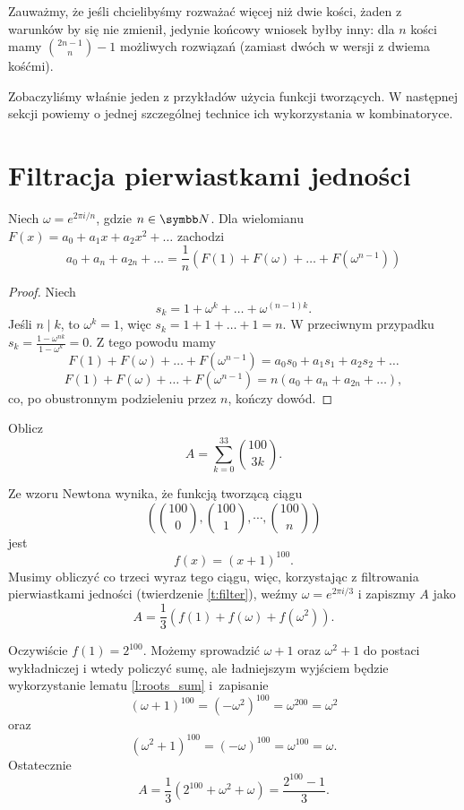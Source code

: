 \documentclass[bibliography=totocnumbered]{scrartcl}
\begin{document}
    Zauważmy, że jeśli chcielibyśmy rozważać więcej niż dwie kości, żaden z warunków by się nie zmienił, jedynie końcowy wniosek byłby inny: dla $n$ kości mamy $\binom{2n - 1}{n} - 1$ możliwych rozwiązań (zamiast dwóch w wersji z dwiema kośćmi).

    Zobaczyliśmy właśnie jeden z przykładów użycia funkcji tworzących. W następnej sekcji powiemy o jednej szczególnej technice ich wykorzystania w kombinatoryce.

\section{Filtracja pierwiastkami jedności}
    \begin{theorem}
        \label{t:filter}
        Niech $\omega = e^{2\pi i/n}$, gdzie $n \in \NN$. Dla wielomianu $F(x) = a_0 + a_1x + a_2x^2 + \ldots$ zachodzi
        $$ a_0 + a_n + a_{2n} + \ldots = \frac{1}{n}\left(F(1) + F(\omega) + \ldots + F(\omega^{n - 1})\right) $$
    \end{theorem}
    \begin{proof}
        Niech
        $$ s_k = 1 + \omega^k + \ldots + \omega^{(n - 1)k}. $$
        Jeśli $n \mid k$, to $\omega^k = 1$, więc $s_k = 1 + 1 + \ldots + 1 = n$. W przeciwnym przypadku $s_k = \frac{1 - \omega^{nk}}{1 - \omega^k} = 0$.
        Z tego powodu mamy
        $$ F(1) + F(\omega) + \ldots + F(\omega^{n - 1}) = a_0s_0 + a_1s_1 + a_2s_2 + \ldots $$
        $$ F(1) + F(\omega) + \ldots + F(\omega^{n - 1}) = n(a_0 + a_n + a_{2n} + \ldots), $$
        co, po obustronnym podzieleniu przez $n$, kończy dowód.
    \end{proof}

    \begin{example}
        Oblicz $$ A = \sum_{k = 0}^{33} \binom{100}{3k}. $$
    \end{example}
    \begin{solution}
        Ze wzoru Newtona wynika, że funkcją tworzącą ciągu
        \[ \left(\textstyle{\binom{100}{0}, \binom{100}{1}, \cdots, \binom{100}{n}}\right) \]
        jest
        $$ f(x) = (x + 1)^{100}. $$
        Musimy obliczyć co trzeci wyraz tego ciągu, więc, korzystając z filtrowania pierwiastkami jedności (twierdzenie \ref{t:filter}), weźmy $\omega = e^{2\pi i /3}$ i zapiszmy $A$ jako
        $$ A = \frac{1}{3}\left(f(1) + f(\omega) + f(\omega^2)\right). $$

        Oczywiście $f(1) = 2^{100}$. Możemy sprowadzić $\omega + 1$ oraz $\omega^2 + 1$ do postaci wykładniczej i wtedy policzyć sumę, ale ładniejszym wyjściem będzie wykorzystanie lematu \ref{l:roots_sum} i~zapisanie
        $$ (\omega + 1)^{100} = (-\omega^2)^{100} = \omega^{200} = \omega^2 $$
        oraz
        $$ (\omega^2 + 1)^{100} = (-\omega)^{100} = \omega^{100} = \omega. $$
        Ostatecznie
        $$ A = \frac{1}{3}\left(2^{100} + \omega^2 + \omega\right) = \frac{2^{100} - 1}{3}. $$

    \end{solution}
\end{document}
